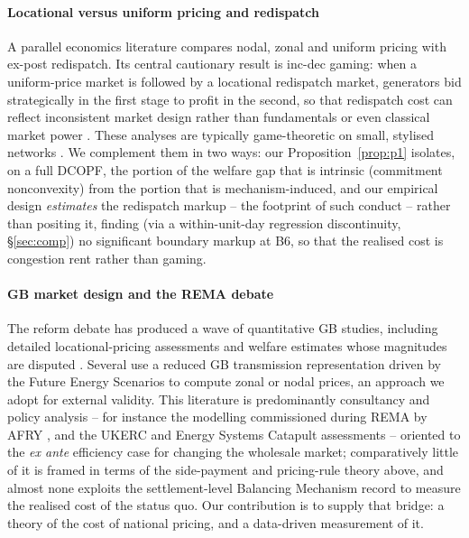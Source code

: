 \documentclass[review,3p,times]{elsarticle}
\theoremstyle{plain}
\theoremstyle{definition}
\begin{document}
\paragraph{Locational versus uniform pricing and redispatch} A parallel
economics literature compares nodal, zonal and uniform pricing with ex-post
redispatch. Its central cautionary result is inc-dec gaming: when a uniform-price
market is followed by a locational redispatch market, generators bid
strategically in the first stage to profit in the second, so that redispatch cost
can reflect inconsistent market design rather than fundamentals or even classical
market power \citep{holmberglazarczyk2015, hirthschlecht2019, holmberg2024}.
These analyses are typically game-theoretic on small, stylised networks
\citep{holmberglazarczyk2015, hirthschlecht2019}. We
complement them in two ways: our Proposition~\ref{prop:p1} isolates, on a full
DCOPF, the portion of the welfare gap that is intrinsic (commitment
nonconvexity) from the portion that is mechanism-induced, and our empirical
design \emph{estimates} the redispatch markup -- the footprint of such conduct --
rather than positing it, finding (via a within-unit-day regression discontinuity,
\S\ref{sec:comp}) no significant boundary markup at B6, so that the realised cost
is congestion rent rather than gaming.

\paragraph{GB market design and the REMA debate} The reform debate has produced
a wave of quantitative GB studies, including detailed locational-pricing
assessments and welfare estimates whose magnitudes are disputed
\citep{afry2025, ukerc2023, riskreward2025}. Several use a reduced GB
transmission representation driven by the Future Energy Scenarios \citep{fes} to compute
zonal or nodal prices, an approach we adopt for external validity. This
literature is predominantly consultancy and policy analysis -- for instance the
modelling commissioned during REMA by AFRY \citep{afry2025},  and the UKERC and
Energy Systems Catapult assessments \citep{ukerc2023, bell2023,
riskreward2025} -- oriented to the \emph{ex ante} efficiency case for changing the
wholesale market; comparatively
little of it is framed in terms of the side-payment and pricing-rule theory
above, and almost none exploits the settlement-level Balancing Mechanism record
to measure the realised cost of the status quo. Our contribution is to supply
that bridge: a theory of the cost of national pricing, and a data-driven
measurement of it.
\end{document}
